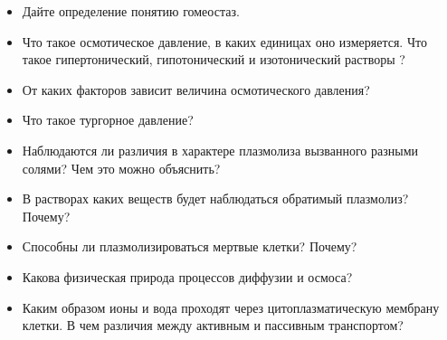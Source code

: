 	\begin{itemize}
		\item Дайте определение понятию \hypertarget{gomiostatsis_question}{гомеостаз}.
		\item Что такое осмотическое давление, в каких единицах оно измеряется. Что такое \hypertarget{hypertonik_liquid}{гипертонический}, гипотонический и изотонический растворы \cite{chem_kuzmenko_eremin}?
		\item От каких факторов зависит величина осмотического давления?
		\item Что такое тургорное давление?
		\item Наблюдаются ли различия в характере плазмолиза вызванного разными солями? Чем это можно объяснить?
		\item В растворах каких веществ будет наблюдаться \hypertarget{reversable_plasmolisys}{обратимый плазмолиз}? Почему?
		\item Способны ли плазмолизироваться мертвые клетки? Почему?
		\item Какова физическая природа процессов диффузии и осмоса?
		\item Каким образом ионы и вода проходят через цитоплазматическую мембрану клетки. В чем различия между активным и пассивным транспортом?
	\end{itemize}
